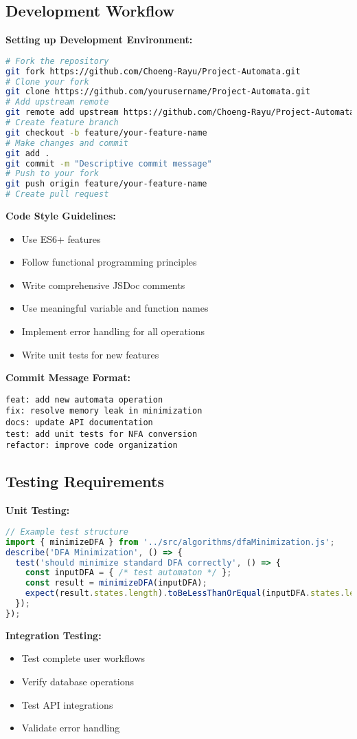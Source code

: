 \documentclass[12pt]{article}
\begin{document}
\subsection{Development Workflow}
\textbf{Setting up Development Environment:}
\begin{lstlisting}[language=bash]
# Fork the repository
git fork https://github.com/Choeng-Rayu/Project-Automata.git
# Clone your fork
git clone https://github.com/yourusername/Project-Automata.git
# Add upstream remote
git remote add upstream https://github.com/Choeng-Rayu/Project-Automata.git
# Create feature branch
git checkout -b feature/your-feature-name
# Make changes and commit
git add .
git commit -m "Descriptive commit message"
# Push to your fork
git push origin feature/your-feature-name
# Create pull request
\end{lstlisting}
\textbf{Code Style Guidelines:}
\begin{itemize}
    \item Use ES6+ features
    \item Follow functional programming principles
    \item Write comprehensive JSDoc comments
    \item Use meaningful variable and function names
    \item Implement error handling for all operations
    \item Write unit tests for new features
\end{itemize}
\textbf{Commit Message Format:}
\begin{lstlisting}
feat: add new automata operation
fix: resolve memory leak in minimization
docs: update API documentation
test: add unit tests for NFA conversion
refactor: improve code organization
\end{lstlisting}

\subsection{Testing Requirements}
\textbf{Unit Testing:}
\begin{lstlisting}[language=JavaScript]
// Example test structure
import { minimizeDFA } from '../src/algorithms/dfaMinimization.js';
describe('DFA Minimization', () => {
  test('should minimize standard DFA correctly', () => {
    const inputDFA = { /* test automaton */ };
    const result = minimizeDFA(inputDFA);
    expect(result.states.length).toBeLessThanOrEqual(inputDFA.states.length);
  });
});
\end{lstlisting}
\textbf{Integration Testing:}
\begin{itemize}
    \item Test complete user workflows
    \item Verify database operations
    \item Test API integrations
    \item Validate error handling
\end{itemize}
\end{document}
